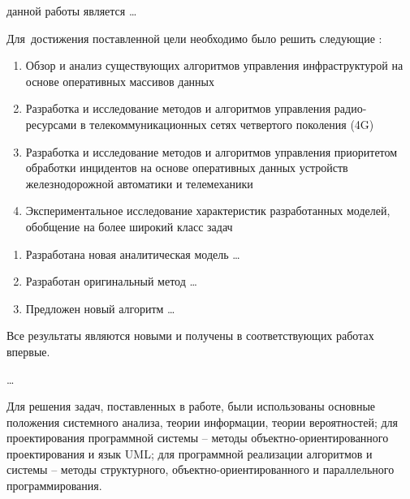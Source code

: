 
{\aim} данной работы является \ldots

Для~достижения поставленной цели необходимо было решить следующие {\tasks}:
\begin{enumerate}
  \item Обзор и анализ существующих алгоритмов управления инфраструктурой на основе оперативных массивов данных
  \item Разработка и исследование методов и алгоритмов управления радио-ресурсами в телекоммуникационных сетях четвертого поколения (4G)
  \item Разработка и исследование методов и алгоритмов управления приоритетом обработки инцидентов на основе оперативных данных устройств железнодорожной автоматики и телемеханики
  \item Экспериментальное исследование характеристик разработанных моделей, обобщение на более широкий класс задач

\end{enumerate}

{\novelty}
\begin{enumerate}
  \item Разработана новая аналитическая модель \ldots
  \item Разработан оригинальный метод \ldots
  \item Предложен новый алгоритм \ldots
\end{enumerate}

Все результаты являются новыми и получены в соответствующих работах впервые.

{\influence} \ldots

{\methods} Для решения задач, поставленных в работе, были использованы основные положения системного анализа, теории информации, теории вероятностей; для проектирования программной системы – методы объектно-ориентированного проектирования и язык UML; для программной реализации алгоритмов и системы – методы структурного, объектно-ориентированного и параллельного программирования.


